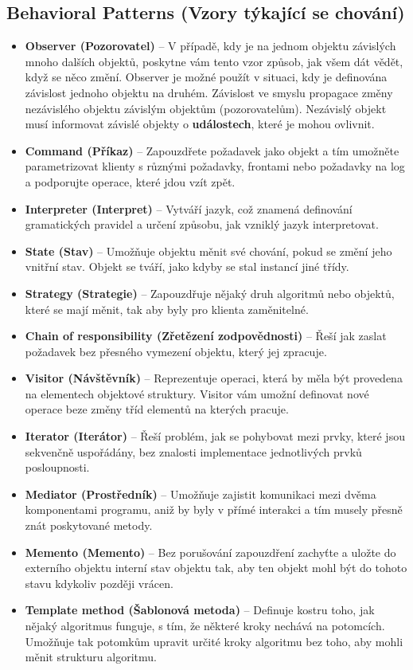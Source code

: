 \subsection{Behavioral Patterns (Vzory týkající se chování)}
\begin{itemize}
    \item \textbf{Observer (Pozorovatel)} -- V případě, kdy je na jednom objektu závislých mnoho dalších objektů, poskytne vám tento vzor způsob, jak všem dát vědět, když se něco změní. Observer je možné použít v situaci, kdy je definována závislost jednoho objektu na druhém. Závislost ve smyslu propagace změny nezávislého objektu závislým objektům (pozorovatelům). Nezávislý objekt musí informovat závislé objekty o \textbf{událostech}, které je mohou ovlivnit.
    \item \textbf{Command (Příkaz)} -- Zapouzdřete požadavek jako objekt a tím umožněte parametrizovat klienty s různými požadavky, frontami nebo požadavky na log a podporujte operace, které jdou vzít zpět.
    \item \textbf{Interpreter (Interpret)} -- Vytváří jazyk, což znamená definování gramatických pravidel a určení způsobu, jak vzniklý jazyk interpretovat.
    \item \textbf{State (Stav)} -- Umožňuje objektu měnit své chování, pokud se změní jeho vnitřní stav. Objekt se tváří, jako kdyby se stal instancí jiné třídy.
    \item \textbf{Strategy (Strategie)} -- Zapouzdřuje nějaký druh algoritmů nebo objektů, které se mají měnit, tak aby byly pro klienta zaměnitelné.
    \item \textbf{Chain of responsibility (Zřetězení zodpovědnosti)} -- Řeší jak zaslat požadavek bez přesného vymezení objektu, který jej zpracuje.
    \item \textbf{Visitor (Návštěvník)} -- Reprezentuje operaci, která by měla být provedena na elementech objektové struktury. Visitor vám umožní definovat nové operace beze změny tříd elementů na kterých pracuje.
    \item \textbf{Iterator (Iterátor)} -- Řeší problém, jak se pohybovat mezi prvky, které jsou sekvenčně uspořádány, bez znalosti implementace jednotlivých prvků posloupnosti.
    \item \textbf{Mediator (Prostředník)} -- Umožňuje zajistit komunikaci mezi dvěma komponentami programu, aniž by byly v přímé interakci a tím musely přesně znát poskytované metody.
    \item \textbf{Memento (Memento)} -- Bez porušování zapouzdření zachyťte a uložte do externího objektu interní stav objektu tak, aby ten objekt mohl být do tohoto stavu kdykoliv později vrácen.
    \item \textbf{Template method (Šablonová metoda)} -- Definuje kostru toho, jak nějaký algoritmus funguje, s tím, že některé kroky nechává na potomcích. Umožňuje tak potomkům upravit určité kroky algoritmu bez toho, aby mohli měnit strukturu algoritmu.
\end{itemize}
